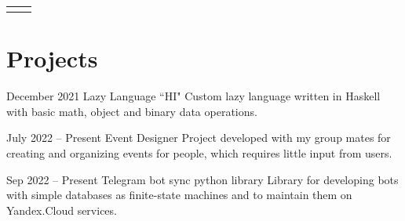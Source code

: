 \documentclass[
	10pt, %
]{FreemanCV}
\begin{document}
\begin{paracol}{2}



\begin{supertabular}{r l} %
	
	
	
	
	
	
\end{supertabular}

\medskip

\section{Projects}

\jobentry
	{December 2021} %
	{} %
	{} %
	{Lazy Language ``HI"} %
	{Custom lazy language written in Haskell with basic math, object and binary data operations.} %


\jobentry
	{July 2022 -- Present} %
	{} %
	{} %
	{Event Designer} %
	{Project developed with my group mates for creating and organizing events for people, which requires little input from users.} %

 \jobentry
	{Sep 2022 -- Present} %
	{} %
	{} %
	{Telegram bot sync python library} %
	{Library for developing bots with simple databases as finite-state machines and to maintain them on Yandex.Cloud services.} %




\end{paracol}
\end{document}

